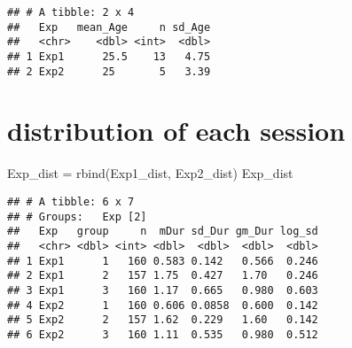 \documentclass[
]{article}
\newenvironment{Shaded}{\begin{snugshade}}{\end{snugshade}}
\newcommand{\AttributeTok}[1]{\textcolor[rgb]{0.77,0.63,0.00}{#1}}
\newcommand{\DecValTok}[1]{\textcolor[rgb]{0.00,0.00,0.81}{#1}}
\newcommand{\FunctionTok}[1]{\textcolor[rgb]{0.00,0.00,0.00}{#1}}
\newcommand{\NormalTok}[1]{#1}
\newcommand{\OtherTok}[1]{\textcolor[rgb]{0.56,0.35,0.01}{#1}}
\newcommand{\SpecialCharTok}[1]{\textcolor[rgb]{0.00,0.00,0.00}{#1}}
\newcommand{\StringTok}[1]{\textcolor[rgb]{0.31,0.60,0.02}{#1}}
\begin{document}
\begin{verbatim}
## # A tibble: 2 x 4
##   Exp   mean_Age     n sd_Age
##   <chr>    <dbl> <int>  <dbl>
## 1 Exp1      25.5    13   4.75
## 2 Exp2      25       5   3.39
\end{verbatim}

\hypertarget{distribution-of-each-session}{%
\section{distribution of each
session}\label{distribution-of-each-session}}

\begin{Shaded}
\begin{Highlighting}[]
\NormalTok{Exp\_dist }\OtherTok{=} \FunctionTok{rbind}\NormalTok{(Exp1\_dist, Exp2\_dist)}
\NormalTok{Exp\_dist}
\end{Highlighting}
\end{Shaded}

\begin{verbatim}
## # A tibble: 6 x 7
## # Groups:   Exp [2]
##   Exp   group     n  mDur sd_Dur gm_Dur log_sd
##   <chr> <dbl> <int> <dbl>  <dbl>  <dbl>  <dbl>
## 1 Exp1      1   160 0.583 0.142   0.566  0.246
## 2 Exp1      2   157 1.75  0.427   1.70   0.246
## 3 Exp1      3   160 1.17  0.665   0.980  0.603
## 4 Exp2      1   160 0.606 0.0858  0.600  0.142
## 5 Exp2      2   157 1.62  0.229   1.60   0.142
## 6 Exp2      3   160 1.11  0.535   0.980  0.512
\end{verbatim}

\begin{Shaded}
\end{Shaded}
\end{document}
